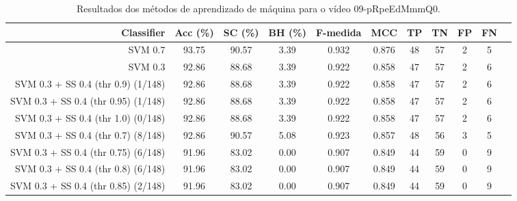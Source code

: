 \begin{table}[!htb]
\centering
\caption{Resultados dos métodos de aprendizado de máquina para o vídeo 09-pRpeEdMmmQ0.}
\label{tab:09-pRpeEdMmmQ0}
\begin{tabular}{r|c|c|c|c|c|c|c|c|c|c}
\hline\hline
Classifier & Acc (\%) & SC (\%) & BH (\%) & F-medida & MCC & TP & TN & FP & FN \\ \hline
SVM 0.7 & 93.75 & 90.57 & 3.39 & 0.932 & 0.876 & 48 & 57 & 2 & 5 \\ 
SVM 0.3 & 92.86 & 88.68 & 3.39 & 0.922 & 0.858 & 47 & 57 & 2 & 6 \\ 
SVM 0.3 + SS 0.4 (thr 0.9) (1/148) & 92.86 & 88.68 & 3.39 & 0.922 & 0.858 & 47 & 57 & 2 & 6 \\ 
SVM 0.3 + SS 0.4 (thr 0.95) (1/148) & 92.86 & 88.68 & 3.39 & 0.922 & 0.858 & 47 & 57 & 2 & 6 \\ 
SVM 0.3 + SS 0.4 (thr 1.0) (0/148) & 92.86 & 88.68 & 3.39 & 0.922 & 0.858 & 47 & 57 & 2 & 6 \\ 
SVM 0.3 + SS 0.4 (thr 0.7) (8/148) & 92.86 & 90.57 & 5.08 & 0.923 & 0.857 & 48 & 56 & 3 & 5 \\ 
SVM 0.3 + SS 0.4 (thr 0.75) (6/148) & 91.96 & 83.02 & 0.00 & 0.907 & 0.849 & 44 & 59 & 0 & 9 \\ 
SVM 0.3 + SS 0.4 (thr 0.8) (6/148) & 91.96 & 83.02 & 0.00 & 0.907 & 0.849 & 44 & 59 & 0 & 9 \\ 
SVM 0.3 + SS 0.4 (thr 0.85) (2/148) & 91.96 & 83.02 & 0.00 & 0.907 & 0.849 & 44 & 59 & 0 & 9 \\ 
\hline\hline
\end{tabular}
\end{table}
